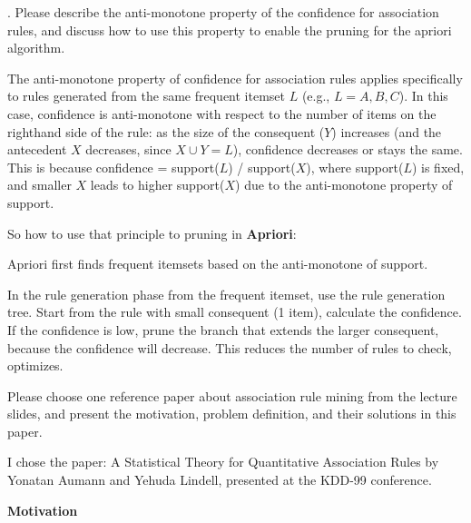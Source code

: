 \documentclass[12pt,letterpaper, onecolumn]{exam}
\begin{document}
\begin{questions}
    . Please describe the anti-monotone property of the confidence for association rules, and discuss how to use this property to enable the pruning for the apriori algorithm. \droppoints
    \begin{solution}
        The anti-monotone property of confidence for association rules applies specifically to rules generated from the same frequent itemset $L$ (e.g., $L = {A, B, C}$). In this case, confidence is anti-monotone with respect to the number of items on the righthand side of the rule: as the size of the consequent ($Y$) increases (and the antecedent $X$ decreases, since $X \cup Y = L$), confidence decreases or stays the same. This is because confidence = support($L$) / support($X$), where support($L$) is fixed, and smaller $X$ leads to higher support($X$) due to the anti-monotone property of support.

        So how to use that principle to pruning in \textbf{Apriori}:

        Apriori first finds frequent itemsets based on the anti-monotone of support.

        In the rule generation phase from the frequent itemset, use the rule generation tree. Start from the rule with small consequent (1 item), calculate the confidence. If the confidence is low, prune the branch that extends the larger consequent, because the confidence will decrease. This reduces the number of rules to check, optimizes.       
    \end{solution}

    \question[40 pts] Please choose one reference paper about association rule mining from the lecture slides, and present the motivation, problem definition, and their solutions in this paper. \droppoints
    \begin{solution}
        I chose the paper: A Statistical Theory for Quantitative Association Rules by Yonatan Aumann and Yehuda Lindell, presented at the KDD-99 conference.
        

        
        \textbf{Motivation}


\end{solution}
\end{questions}
\end{document}
